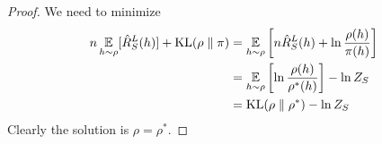 \begin{proof}
  We need to minimize
  \begin{equation}
    \begin{split}
      n \operatorname*{\mathbb{E}}_{h \sim \rho}[\hat{R}_S^L(h)] + \text{KL}(\rho \parallel \pi)
      &= \operatorname*{\mathbb{E}}_{h \sim \rho}\left[n \hat{R}_S^L(h) +
      \ln\frac{\rho(h)}{\pi(h)}\right] \\
      &= \operatorname*{\mathbb{E}}_{h \sim \rho}\left[\ln\frac{\rho(h)}{\rho^*(h)}\right] - \ln Z_S \\
      &= \text{KL}(\rho \parallel \rho^*) - \ln Z_S
    \end{split}
  \end{equation}
  Clearly the solution is $\rho = \rho^*$.
\end{proof}
